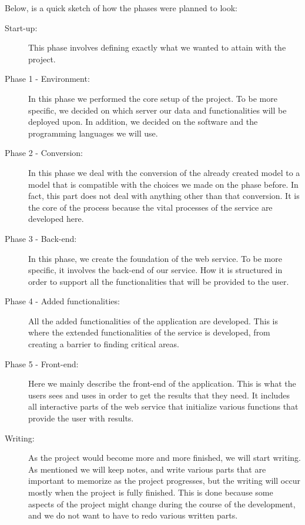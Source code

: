 Below, is a quick sketch of how the phases were planned to look:

\begin{description}
	\item [Start-up:]
This phase involves defining exactly what we wanted to attain with the project.

  \item[Phase 1 - Environment:] In this phase we performed the core setup of the project. To be more specific, we decided on which server our data and functionalities will be deployed upon. In addition, we decided on the software and the programming languages  we will use.
  
  \item[Phase 2 - Conversion:] In this phase we deal with the conversion of the already created model to a model that is compatible with the choices we made on the phase before. In fact, this part does not deal with anything other than that conversion. It is the core of the process because the vital processes of the service are developed here.
  
  \item[Phase 3 - Back-end:] In this phase, we create the foundation of the web service. To be more specific, it involves the back-end of our service. How it is structured in order to support all the functionalities that will be provided to the user. 
  
  \item[Phase 4 - Added functionalities:] All the added functionalities of the application are developed. This is where the extended functionalities of the service is developed, from creating a barrier to finding critical areas. 
  
  \item[Phase 5 - Front-end:]Here we mainly describe the front-end of the application. This is what the users sees and uses in order to get the results that they need. It includes all interactive parts of the web service that initialize various functions  that provide the user with results.

  \item[Writing:]As the project would become more and more finished, we will start writing. As mentioned we will keep notes, and write various parts that are important to memorize as the project progresses, but the writing will occur mostly when the project is fully finished. This is done because some aspects of the project might change during the course of the development, and we do not want to have to redo various written parts.
\end{description}

